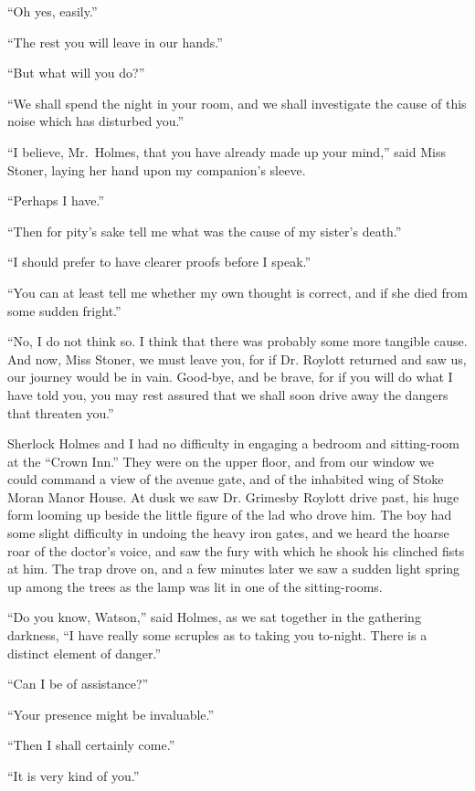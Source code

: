 “Oh yes, easily.”

“The rest you will leave in our hands.”

“But what will you do?”

“We shall spend the night in your room, and we shall investigate
the cause of this noise which has disturbed you.”

“I believe, Mr.~Holmes, that you have already made up
your mind,” said Miss Stoner, laying her hand upon my companion’s
sleeve.

“Perhaps I have.”

“Then for pity’s sake tell me what was the cause of my
sister’s death.”

“I should prefer to have clearer proofs before I speak.”

“You can at least tell me whether my own thought is correct,
and if she died from some sudden fright.”

“No, I do not think so. I think that there was probably
some more tangible cause. And now, Miss Stoner, we must
leave you, for if Dr. Roylott returned and saw us, our journey
would be in vain. Good-bye, and be brave, for if you will do
what I have told you, you may rest assured that we shall soon
drive away the dangers that threaten you.”

Sherlock Holmes and I had no difficulty in engaging a bedroom
and sitting-room at the “Crown Inn.” They were on
the upper floor, and from our window we could command a
view of the avenue gate, and of the inhabited wing of Stoke
Moran Manor House. At dusk we saw Dr. Grimesby Roylott
drive past, his huge form looming up beside the little figure
of the lad who drove him. The boy had some slight
difficulty in undoing the heavy iron gates, and we heard the
hoarse roar of the doctor’s voice, and saw the fury with which
he shook his clinched fists at him. The trap drove on, and a
few minutes later we saw a sudden light spring up among the
trees as the lamp was lit in one of the sitting-rooms.

“Do you know, Watson,” said Holmes, as we sat together
in the gathering darkness, “I have really some scruples as to
taking you to-night. There is a distinct element of danger.”

“Can I be of assistance?”

“Your presence might be invaluable.”

“Then I shall certainly come.”

“It is very kind of you.”

